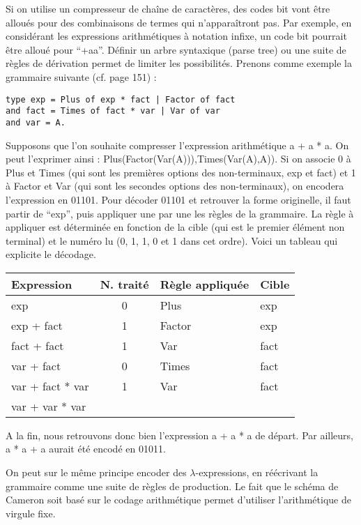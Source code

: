 \documentclass[titlepage]{article}
\begin{document}
Si on utilise un compresseur de chaîne de caractères, des codes bit vont être alloués pour des combinaisons de termes qui n'apparaîtront pas. Par exemple, en considérant les expressions arithmétiques à notation infixe, un code bit pourrait être alloué pour ``+aa''.
Définir un arbre syntaxique (parse tree) ou une suite de règles de dérivation permet de limiter les possibilités.
Prenons comme exemple la grammaire suivante (cf. page 151) :
\begin{lstlisting}
type exp = Plus of exp * fact | Factor of fact
and fact = Times of fact * var | Var of var
and var = A.
\end{lstlisting} 
Supposons que l'on souhaite compresser l'expression arithmétique a + a * a. On peut l'exprimer ainsi : Plus(Factor(Var(A))),Times(Var(A),A)). Si on associe 0 à Plus et Times (qui sont les premières options des non-terminaux, exp et fact) et 1 à Factor et Var (qui sont les secondes options des non-terminaux), on encodera l'expression en 01101. Pour décoder 01101 et retrouver la forme originelle, il faut partir de ``exp'', puis appliquer une par une les règles de la grammaire. La règle à appliquer est déterminée en fonction de la cible (qui est le premier élément non terminal) et le numéro lu (0, 1, 1, 0 et 1 dans cet ordre). Voici un tableau qui explicite le décodage.
\begin{center}
   \begin{tabular}{ | l | c | l | l | }
     \hline
     Expression & N. traité & Règle appliquée & Cible \\ \hline
     exp & 0 & Plus & exp \\ \hline
     exp + fact & 1 & Factor & exp \\ \hline
     fact + fact & 1 & Var & fact \\ \hline
     var + fact & 0 & Times & fact \\ \hline
     var + fact * var & 1 & Var & fact \\ \hline
     var + var * var & &  & \\
     \hline
   \end{tabular}
 \end{center}

A la fin, nous retrouvons donc bien l'expression a + a * a de départ. Par ailleurs, a * a + a aurait été encodé en 01011.

On peut sur le même principe encoder des $\lambda$-expressions, en réécrivant la grammaire comme une suite de règles de production. Le fait que le schéma de Cameron soit basé sur le codage arithmétique permet d'utiliser l'arithmétique de virgule fixe.
\end{document}
